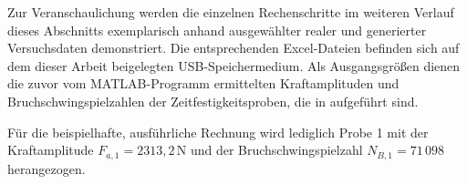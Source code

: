 	Zur Veranschaulichung werden die einzelnen Rechenschritte im weiteren Verlauf dieses Abschnitts exemplarisch anhand ausgewählter realer und generierter Versuchsdaten demonstriert. Die entsprechenden Excel-Dateien befinden sich auf dem dieser Arbeit beigelegten USB-Speichermedium. Als Ausgangsgrößen dienen die zuvor vom MATLAB-Programm ermittelten Kraftamplituden und Bruchschwingspielzahlen der Zeitfestigkeitsproben, die in  aufgeführt sind.
\begin{table}[H]
\centering
\caption{Kraftamplituden und Bruchschwingspielzahlen der Zeitfestigkeitsproben}
\label{tab:Zeitfestigkeitsproben}

\renewcommand{\arraystretch}{1.2}

\end{table}

	Für die beispielhafte, ausführliche Rechnung wird lediglich Probe 1 mit der Kraftamplitude $F_{a,1} = 2313{,}2\,\mathrm{N}$ und der Bruchschwingspielzahl $N_{B,1} = 71\,098$ herangezogen.
	
